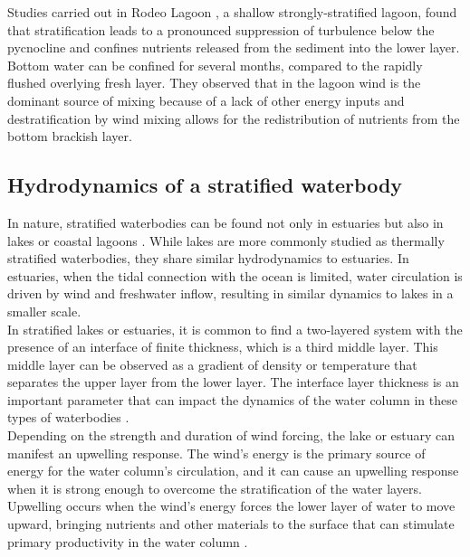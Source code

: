 \documentclass[tesis.tex]{subfiles}
\begin{document}
Studies carried out in Rodeo Lagoon \citep{Cousins2010}, a shallow strongly-stratified lagoon, found that stratification leads to a pronounced suppression of turbulence below the pycnocline and confines nutrients released from the sediment into the lower layer. Bottom water can be confined for several months, compared to the rapidly flushed overlying fresh layer. They observed that in the lagoon wind is the dominant source of mixing because of a lack of other energy inputs and destratification by wind mixing allows for the redistribution of nutrients from the bottom brackish layer.\\

\subsection{Hydrodynamics of a stratified waterbody}

In nature, stratified waterbodies can be found not only in estuaries \citep{human2016} but also in lakes \citep{Valerio2012, Imam2013, Coman2012} or coastal lagoons \citep{Cousins2010}. While lakes are more commonly studied as thermally stratified waterbodies, they share similar hydrodynamics to estuaries. In estuaries, when the tidal connection with the ocean is limited, water circulation is driven by wind and freshwater inflow, resulting in similar dynamics to lakes in a smaller scale. \\

In stratified lakes or estuaries, it is common to find a two-layered system with the presence of an interface of finite thickness, which is a third middle layer. This middle layer can be observed as a gradient of density or temperature that separates the upper layer from the lower layer. The interface layer thickness is an important parameter that can impact the dynamics of the water column in these types of waterbodies \citep{simpson1974fronts}.\\

Depending on the strength and duration of wind forcing, the lake or estuary can manifest an upwelling response. The wind's energy is the primary source of energy for the water column's circulation, and it can cause an upwelling response when it is strong enough to overcome the stratification of the water layers. Upwelling occurs when the wind's energy forces the lower layer of water to move upward, bringing nutrients and other materials to the surface that can stimulate primary productivity in the water column \citep{macintyre2010ecosystem}. \\
\end{document}

